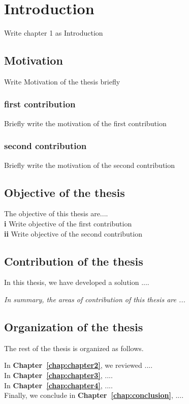 \chapter{Introduction}
\label{chap:intro}
Write chapter 1 as Introduction
\section{Motivation}
Write Motivation of the thesis briefly

\subsection{first contribution} 
Briefly write the motivation of the first contribution

\subsection{second contribution} 
Briefly write the motivation of the second contribution

\section{Objective of the thesis}
\label{objective}
The objective of this thesis are....\\
%
\textbf{i} Write objective of the first contribution\\
%
\textbf{ii} Write objective of the second contribution\\
%
%
%

\section{Contribution of the thesis}
In this thesis, we have developed a solution ....

\emph{In summary, the areas of contribution of this thesis are ...}

\section{Organization of the thesis}
The rest of the thesis is organized as follows.

In \textbf{Chapter~\ref{chap:chapter2}}, we reviewed ....\\
In \textbf{Chapter~\ref{chap:chapter3}}, ....\\
In \textbf{Chapter~\ref{chap:chapter4}}, ....\\
Finally, we conclude in \textbf{Chapter~\ref{chap:conclusion}}, ....\\







































